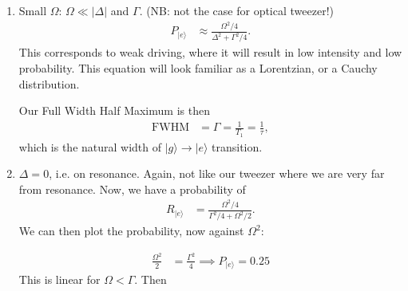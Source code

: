 \documentclass[a4paper, 11pt, normalem]{report}
\begin{document}
\begin{enumerate}
    \item Small $\Omega$: $\Omega\ll|\Delta|$ and $\Gamma$. (NB: not the case for optical tweezer!)
        \begin{align}
            P_{|e\rangle} &\approx \frac{\Omega^2/4}{\Delta^2 + \Gamma^2/4}.
        \end{align}
        This corresponds to weak driving, where it will result in low intensity and low probability.
        This equation will look familiar as a Lorentzian, or a Cauchy distribution.
        \begin{figure}[H]
            \centering
        \end{figure}
        Our Full Width Half Maximum is then
        \begin{align}
            \text{FWHM} &= \Gamma = \frac{1}{T_1}=\frac{1}{\tau},
        \end{align}
        which is the natural width of $|g\rangle\to|e\rangle$ transition.
    \item $\Delta=0$, i.e. on resonance.
        Again, not like our tweezer where we are very far from resonance.
        Now, we have a probability of
        \begin{align}
            R_{|e\rangle} &= \frac{\Omega^2/4}{\Gamma^2/4 + \Omega^2/2}.
        \end{align}
        We can then plot the probability, now against $\Omega^2$:
        \begin{figure}[H]
            \centering
        \end{figure}
        \begin{align}
            \frac{\Omega^2}{2} &= \frac{\Gamma^2}{4} \implies P_{|e\rangle} = 0.25
        \end{align}
        This is linear for $\Omega<\Gamma$.
        Then

\end{enumerate}
\end{document}

